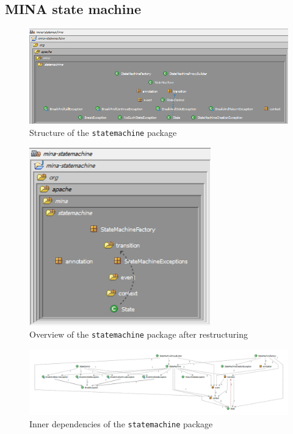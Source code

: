 \subsection{MINA state machine}

\begin{figure}[H]
    \centering
    \includegraphics[width=\textwidth]{images/MINA_structure_statemachine_initial.png}
    \caption{Structure of the \texttt{statemachine} package}
    \label{fig:statemachine_initial}
\end{figure}

\begin{figure}[H]
    \centering
    \includegraphics[width=0.7\textwidth]{images/MINA_structure_statemachine_restructured.png}
    \caption{Overview of the \texttt{statemachine} package after restructuring}
    \label{fig:statemachine_restructured}
\end{figure}

\begin{landscape}
\begin{figure}
    \centering
    \includegraphics[scale = 0.5]{images/MINA_dependencies_statemachine_initial.png}
    \caption{Inner dependencies of the \texttt{statemachine} package}
    \label{fig:statemachine_initial_dependencies}
\end{figure}
\end{landscape}

